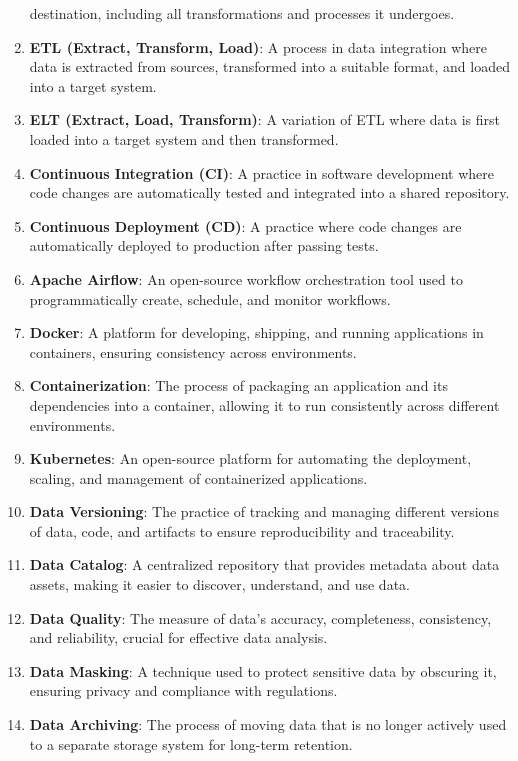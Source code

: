 \documentclass[
  letterpaper,
  DIV=11,
  numbers=noendperiod]{scrartcl}
\begin{document}
\begin{enumerate}
  destination, including all transformations and processes it undergoes.
\item
  \textbf{ETL (Extract, Transform, Load)}: A process in data integration
  where data is extracted from sources, transformed into a suitable
  format, and loaded into a target system.
\item
  \textbf{ELT (Extract, Load, Transform)}: A variation of ETL where data
  is first loaded into a target system and then transformed.
\item
  \textbf{Continuous Integration (CI)}: A practice in software
  development where code changes are automatically tested and integrated
  into a shared repository.
\item
  \textbf{Continuous Deployment (CD)}: A practice where code changes are
  automatically deployed to production after passing tests.
\item
  \textbf{Apache Airflow}: An open-source workflow orchestration tool
  used to programmatically create, schedule, and monitor workflows.
\item
  \textbf{Docker}: A platform for developing, shipping, and running
  applications in containers, ensuring consistency across environments.
\item
  \textbf{Containerization}: The process of packaging an application and
  its dependencies into a container, allowing it to run consistently
  across different environments.
\item
  \textbf{Kubernetes}: An open-source platform for automating the
  deployment, scaling, and management of containerized applications.
\item
  \textbf{Data Versioning}: The practice of tracking and managing
  different versions of data, code, and artifacts to ensure
  reproducibility and traceability.
\item
  \textbf{Data Catalog}: A centralized repository that provides metadata
  about data assets, making it easier to discover, understand, and use
  data.
\item
  \textbf{Data Quality}: The measure of data's accuracy, completeness,
  consistency, and reliability, crucial for effective data analysis.
\item
  \textbf{Data Masking}: A technique used to protect sensitive data by
  obscuring it, ensuring privacy and compliance with regulations.
\item
  \textbf{Data Archiving}: The process of moving data that is no longer
  actively used to a separate storage system for long-term retention.

\end{enumerate}
\end{document}

